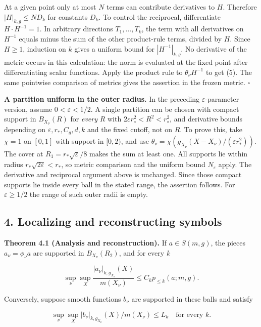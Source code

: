 \documentclass[
  11pt,
]{article}
\begin{document}
At a given point only at most \(N\) terms can contribute derivatives to
\(H\). Therefore \(|H|_{k,g}\leq ND_k\) for constants \(D_k\). To
control the reciprocal, differentiate \(H\cdot H^{-1}=1\). In arbitrary
directions \(T_1,\ldots,T_k\), the term with all derivatives on
\(H^{-1}\) equals minus the sum of the other product-rule terms, divided
by \(H\). Since \(H\geq1\), induction on \(k\) gives a uniform bound for
\(|H^{-1}|_{k,g}\). No derivative of the metric occurs in this
calculation: the norm is evaluated at the fixed point after
differentiating scalar functions. Apply the product rule to
\(\theta_\nu H^{-1}\) to get (5). The same pointwise comparison of
metrics gives the assertion in the frozen metric. \(\square\)

\textbf{A partition uniform in the outer radius.} In the preceding
\(\varepsilon\)-parameter version, assume \(0<\varepsilon<1/2\). A
single partition can be chosen with compact support in \(B_{X_\nu}(R)\)
for \emph{every} \(R\) with \(2\varepsilon r_*^2<R^2<r_*^2\), and
derivative bounds depending on \(\varepsilon,r_*,C_g,d,k\) and the fixed
cutoff, not on \(R\). To prove this, take \(\chi=1\) on \([0,1]\) with
support in \([0,2)\), and use
\(\theta_\nu=\chi(g_{X_\nu}(X-X_\nu)/(\varepsilon r_*^2))\). The cover
at \(R_1=r_*\sqrt\varepsilon/8\) makes the sum at least one. All
supports lie within radius \(r_*\sqrt{2\varepsilon}<r_*\), so metric
comparison and the uniform bound \(N_\varepsilon\) apply. The derivative
and reciprocal argument above is unchanged. Since those compact supports
lie inside every ball in the stated range, the assertion follows. For
\(\varepsilon\geq1/2\) the range of such outer radii is empty.

\subsection{4. Localizing and reconstructing
symbols}\label{localizing-and-reconstructing-symbols}

\textbf{Theorem 4.1 (Analysis and reconstruction).} If \(a\in S(m,g)\),
the pieces \(a_\nu=\phi_\nu a\) are supported in \(B_{X_\nu}(R_2)\), and
for every \(k\)

\[
\sup_\nu\sup_X\frac{|a_\nu|_{k,g_{X_\nu}}(X)}{m(X_\nu)}
\leq C_k p_{\leq k}(a;m,g).                                     \tag{7}
\]

Conversely, suppose smooth functions \(b_\nu\) are supported in these
balls and satisfy

\[
\sup_\nu\sup_X |b_\nu|_{k,g_{X_\nu}}(X)/m(X_\nu)\leq L_k
\quad\text{for every }k.                                       \tag{8}
\]
\end{document}
